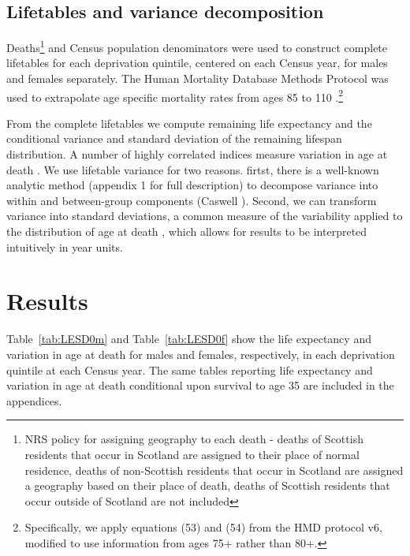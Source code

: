 \documentclass[12pt,oneside,a4paper]{article} %
\theoremstyle{definition}
\begin{document}
\subsection{Lifetables and variance decomposition}
Deaths\footnote{NRS policy for assigning geography to each death - deaths of Scottish residents that occur in Scotland are assigned to their place of normal residence, deaths of non-Scottish residents that occur in Scotland are assigned a geography based on their place of death, deaths of Scottish residents that occur outside of Scotland are not included\citep{GeneralRegisterOfficeforScotland2016}} and Census population denominators were used to construct complete
lifetables for each deprivation quintile, centered on each Census year, for
males and females separately.  The Human Mortality Database
Methods Protocol was used to extrapolate age specific mortality rates from
ages 85 to 110 \citep{Wilmoth2017}.\footnote{Specifically, we apply equations (53) and
(54) from the HMD protocol v6, modified to use information from ages 75+
rather than 80+.} 

From the complete lifetables we compute remaining
life expectancy and the conditional variance and standard deviation of
the remaining lifespan distribution. A number of highly correlated indices measure variation in age at
death \citep{Raalte2013}. We use lifetable variance for
two reasons. firtst, there is a well-known analytic method (appendix 1 for full description) to decompose variance
into within and between-group components (Caswell \citeyear{Caswell2001,Caswell2009,Caswell2014}). Second, we can transform variance into standard deviations, a common measure of the variability applied to the distribution of age at death \citep{Raalte2013}, which allows for results to be interpreted intuitively in year units. 


\section{Results}
Table~\ref{tab:LESD0m} and Table~\ref{tab:LESD0f} show the life expectancy and
variation in age at death for males and females, respectively, in each
deprivation quintile at each Census year. The same tables reporting life expectancy and variation in age at death conditional upon survival to age 35 are included in the appendices.
\end{document}
